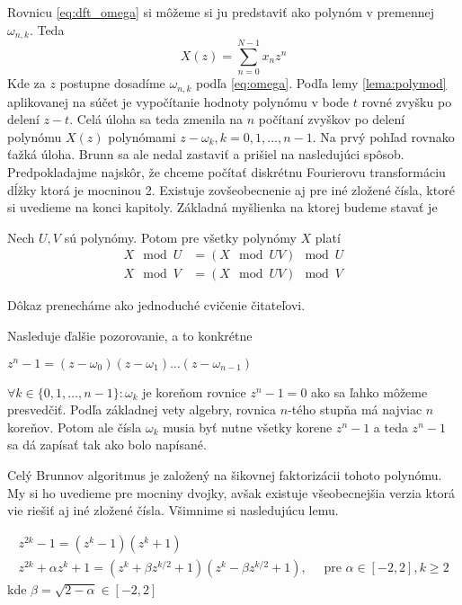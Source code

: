Rovnicu \ref{eq:dft_omega} si
môžeme si ju predstaviť ako polynóm v premennej $\omega_{n,k}$.
Teda
\begin{equation}
    X(z) = \sum_{n=0}^{N-1} x_n z^n
\end{equation}
Kde za $z$ postupne dosadíme $\omega_{n,k}$ podľa
\ref{eq:omega}.
Podľa lemy \ref{lema:polymod} aplikovanej na súčet je vypočítanie
hodnoty polynómu v bode $t$ rovné zvyšku po delení $z-t$.
Celá úloha sa teda zmenila na $n$ počítaní zvyškov po delení polynómu
$X(z)$ polynómami $z-\omega_k, k=0,1,\dots,n-1$. Na prvý pohľad
rovnako ťažká úloha. Brunn sa ale nedal zastaviť a prišiel na
nasledujúci spôsob. Predpokladajme najskôr, že chceme počítať
diskrétnu Fourierovu transformáciu dĺžky ktorá je mocninou 2.
Existuje zovšeobecnenie aj pre iné zložené čísla, 
ktoré si uvedieme na konci kapitoly.
Základná myšlienka na ktorej budeme stavať je
\begin{lema}
    Nech $U,V$ sú polynómy. Potom pre všetky polynómy $X$ platí
    \begin{align}
        X \mod U &= (X \mod UV) \mod U \\
        X \mod V &= (X \mod UV) \mod V
    \end{align}
\end{lema}
\begin{dokaz}
    Dôkaz prenecháme ako jednoduché cvičenie čitateľovi.
\end{dokaz}
Nasleduje ďalšie pozorovanie, a to konkrétne
\begin{lema}
    $z^n - 1 = (z - \omega_0)(z-\omega_1)\dots(z-\omega_{n-1})$
\end{lema}
\begin{dokaz}
    $\forall k \in \{0,1,\dots,n-1\}: \omega_k$ je koreňom rovnice
    $z^n-1=0$ ako sa ľahko môžeme presvedčiť. Podľa základnej vety
    algebry, rovnica $n$-tého stupňa má najviac $n$ koreňov. Potom
    ale čísla $\omega_k$ musia byť nutne všetky korene $z^n-1$
    a teda $z^n-1$ sa dá zapísať tak ako bolo napísané.
\end{dokaz}
Celý Brunnov algoritmus je založený na šikovnej faktorizácii tohoto
polynómu. My si ho uvedieme pre mocniny dvojky, avšak existuje
všeobecnejšia verzia ktorá vie riešiť aj iné zložené čísla.
Všimnime si nasledujúcu lemu.
\begin{lema}
    \begin{align}
        z^{2k} -1 = (z^k - 1)( z^k + 1) \\
        z^{2k} + \alpha z^k + 1 = ( z^k + \beta z^{k/2} + 1)
            ( z^k - \beta z^{k/2} + 1), \quad
            \text{ pre }\alpha \in [-2,2], k\ge 2
    \end{align}
    kde $\beta = \sqrt{2-\alpha} \in [-2,2]$
\end{lema}
